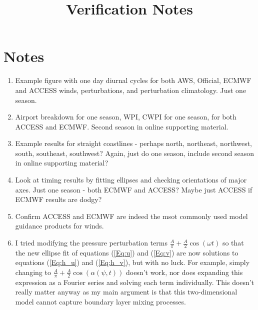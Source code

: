 \documentclass{article}
\title{Verification Notes}
\begin{document}
\maketitle

\section{Notes}

\begin{enumerate}
\item
Example figure with one day diurnal cycles for both AWS, Official, ECMWF and ACCESS winds, perturbations, and perturbation climatology. Just one season.
\item
Airport breakdown for one season, WPI, CWPI for one season, for both ACCESS and ECMWF. Second season in online supporting material.
\item
Example results for straight coastlines - perhaps north, northeast, northwest, south, southeast, southwest? Again, just do one season, include second season in online supporting material?
\item
Look at timing results by fitting ellipses and checking orientations of major axes. Just one season - both ECMWF and ACCESS? Maybe just ACCESS if ECMWF results are dodgy?
\item
Confirm ACCESS and ECMWF are indeed the msot commonly used model guidance products for winds. 
\item
I tried modifying the pressure perturbation terms $\frac{A}{\pi} + \frac{A}{2} \cos \left(\omega t\right)$ so that the new ellipse fit of equations (\ref{Eq:u}) and (\ref{Eq:v}) are now solutions to equations (\ref{Eq:h_u}) and (\ref{Eq:h_v}), but with no luck. For example, simply changing to $\frac{A}{\pi} + \frac{A}{2} \cos \left(\alpha\left(\psi,t\right)\right)$ doesn't work, nor does expanding this expression as a Fourier series and solving each term individually. This doesn't really matter anyway as my main argument is that this two-dimensional model cannot capture boundary layer mixing processes.
\end{enumerate}
\end{document}
